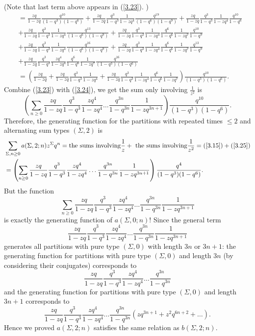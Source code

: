 \documentclass[draft]{amsart}
\numberwithin{equation}{section}
\theoremstyle{plain}
\theoremstyle{remark}
\begin{document}
(Note that last term above appears in (\ref{3.23}). )
\begin{align}
&=\frac{zq}{1-zq}\frac{q^{10}}{(1-q^{3})(1-q^{6})} +\frac{zq}{1-zq}\frac{q^{3}}{1-q^{3}}\frac{1}{1-zq^{4}}\frac{q^{19}}{(1-q^{6})(1-q^{9})} +\frac{zq}{1-zq}\frac{q^{3}}{1-q^{3}}\frac{1}{1-zq^{4}}\frac{q^{10}}{1-q^{6}} \nonumber\\
&+\frac{zq}{1-zq}\frac{q^{3}}{1-q^{3}}\frac{1}{1-zq^{4}}\frac{q^{13}}{(1-q^{6})(1-q^{9})}
+\frac{zq}{1-zq}\frac{q^{3}}{1-q^{3}}\frac{1}{1-zq^{4}}\frac{q^{6}}{1-q^{6}}\frac{1}{1-zq^{7}}\frac{q^{10}}{1-q^{9}}\nonumber\\
&+\frac{zq}{1-zq}\frac{q^{3}}{1-q^{3}}\frac{1}{1-zq^{4}}\frac{q^{16}}{(1-q^{6})(1-q^{9})} 
+\frac{zq}{1-zq}\frac{q^{3}}{1-q^{3}}\frac{1}{1-zq^{4}}\frac{q^{6}}{1-q^{6}}\frac{1}{1-zq^{7}}\frac{q^{13}}{1-q^{9}}\nonumber\\
&+\frac{zq}{1-zq}\frac{q^{3}}{1-q^{3}}\frac{zq^{4}}{1-zq^{4}}\frac{q^{6}}{1-q^{6}}\frac{1}{1-zq^{7}}\frac{q^{16}}{(1-q^{3})(1-q^{6})}\nonumber\\
&=\left(\frac{zq}{1-zq} +\frac{zq}{1-zq}\frac{q^{3}}{1-q^{3}}\frac{1}{1-zq^{4}}+\frac{zq}{1-zq}\frac{q^{3}}{1-q^{3}}\frac{1}{1-zq^{4}}\frac{q^{6}}{1-q^{6}}\frac{1}{1-zq^{7}}  \right)\frac{q^{10}}{(1-q^{3})(1-q^{6})}.\label{3.24}
\end{align} 
Combine (\ref{3.23}) with (\ref{3.24}), we get the sum only involving $\frac{1}{z^{2}}$ is
\begin{equation}\label{3.25}
\left(\sum_{n\geq 0}\frac{zq}{1-zq}\frac{q^{3}}{1-q^{3}} \frac{zq^{4}}{1-zq^{4}}\dots\frac{q^{3n}}{1-q^{3n}}\frac{1}{1-zq^{3n+1}}\right)\frac{q^{10}}{(1-q^{3})(1-q^{6})}.
\end{equation}
Therefore, the generating function for the partitions with repeated times $\leq2$ and alternating sum types $(\Sigma,2)$ is
\begin{align*}
&\sum_{\Sigma, n\geq 0}a(\Sigma, 2;n)z^{\Sigma}q^{n}
=\mbox{the sums involving} \frac{1}{z} + \mbox{ the sums involving} \frac{1}{z^{2}}=(\ref{3.15})+(\ref{3.25})\\
&=\left(\sum_{n\geq 0}\frac{zq}{1-zq}\frac{q^{3}}{1-q^{3}} \frac{zq^{4}}{1-zq^{4}}\dots\frac{q^{3n}}{1-q^{3n}}\frac{1}{1-zq^{3n+1}}\right)\frac{q^{4}}{(1-q^{3})(1-q^{6})}.
\end{align*}
But the function
$$
\sum_{n\geq 0}\frac{zq}{1-zq}\frac{q^{3}}{1-q^{3}} \frac{zq^{4}}{1-zq^{4}}\dots\frac{q^{3n}}{1-q^{3n}}\frac{1}{1-zq^{3n+1}}
$$
is exactly the generating function of $a(\Sigma, 0; n)$!  Since the general term 
$$
\frac{zq}{1-zq}\frac{q^{3}}{1-q^{3}} \frac{zq^{4}}{1-zq^{4}}\dots\frac{q^{3n}}{1-q^{3n}}\frac{1}{1-zq^{3n+1}}
$$
generates all partitions with pure type $(\Sigma, 0)$  with length $3n$ or $3n+1$:  the generating function for partitions with pure type $(\Sigma, 0)$ and length $3n$ (by considering their conjugates) corresponds to 
$$
\frac{zq}{1-zq}\frac{q^{3}}{1-q^{3}} \frac{zq^{4}}{1-zq^{4}}\dots\frac{q^{3n}}{1-q^{3n}}
$$
and the generating function for partitions with pure type $(\Sigma, 0)$ and length $3n+1$ corresponds to
$$
\frac{zq}{1-zq}\frac{q^{3}}{1-q^{3}} \frac{zq^{4}}{1-zq^{4}}\dots\frac{q^{3n}}{1-q^{3n}}(zq^{3n+1}+z^{2}q^{6n+2}+\dots).$$
Hence we proved $a(\Sigma, 2;n)$ satisfies the same relation as $b(\Sigma, 2;n)$.   
\end{document}
